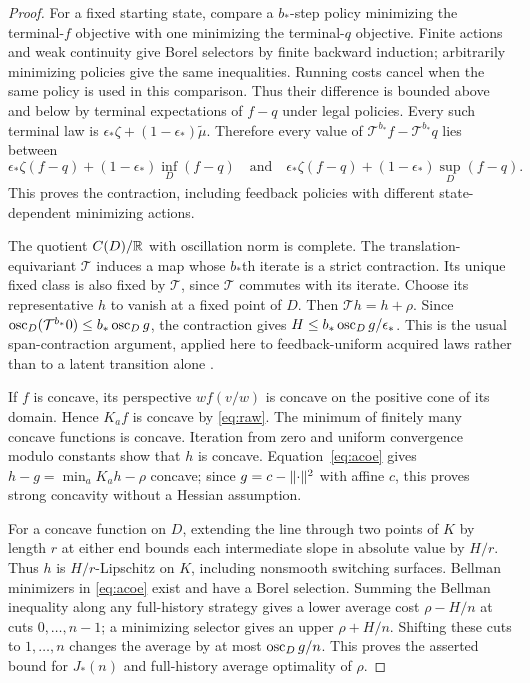 \begin{proof}
For a fixed starting state, compare a $b_*$-step policy minimizing the terminal-$f$ objective with one minimizing the terminal-$q$ objective. Finite actions and weak continuity give Borel selectors by finite backward induction; arbitrarily minimizing policies give the same inequalities. Running costs cancel when the same policy is used in this comparison. Thus their difference is bounded above and below by terminal expectations of $f-q$ under legal policies. Every such terminal law is
$\epsilon_*\zeta+(1-\epsilon_*)\widetilde\mu$. Therefore every value of $\mathcal T^{b_*}f-\mathcal T^{b_*}q$ lies between
\[
 \epsilon_*\zeta(f-q)+(1-\epsilon_*)\inf_D(f-q)
 \quad\text{and}\quad
 \epsilon_*\zeta(f-q)+(1-\epsilon_*)\sup_D(f-q).
\]
This proves the contraction, including feedback policies with different state-dependent minimizing actions.

The quotient $C(D)/\mathbb R$ with oscillation norm is complete. The translation-equivariant $\mathcal T$ induces a map whose $b_*$th iterate is a strict contraction. Its unique fixed class is also fixed by $\mathcal T$, since $\mathcal T$ commutes with its iterate. Choose its representative $h$ to vanish at a fixed point of $D$. Then $\mathcal T h=h+\rho$. Since $\operatorname{osc}_D(\mathcal T^{b_*}0)\le b_*\operatorname{osc}_Dg$, the contraction gives $H\le b_*\operatorname{osc}_Dg/\epsilon_*$. This is the usual span-contraction argument, applied here to feedback-uniform acquired laws rather than to a latent transition alone \cite{Dobrushin1956,Kurano1986}.

If $f$ is concave, its perspective $w f(v/w)$ is concave on the positive cone of its domain. Hence $K_af$ is concave by \eqref{eq:raw}. The minimum of finitely many concave functions is concave. Iteration from zero and uniform convergence modulo constants show that $h$ is concave. Equation~\eqref{eq:acoe} gives
$h-g=\min_aK_ah-\rho$ concave; since $g=c-\lVert\cdot\rVert^2$ with affine $c$, this proves strong concavity without a Hessian assumption.

For a concave function on $D$, extending the line through two points of $K$ by length $r$ at either end bounds each intermediate slope in absolute value by $H/r$. Thus $h$ is $H/r$-Lipschitz on $K$, including nonsmooth switching surfaces. Bellman minimizers in \eqref{eq:acoe} exist and have a Borel selection. Summing the Bellman inequality along any full-history strategy gives a lower average cost $\rho-H/n$ at cuts $0,\ldots,n-1$; a minimizing selector gives an upper $\rho+H/n$. Shifting these cuts to $1,\ldots,n$ changes the average by at most $\operatorname{osc}_Dg/n$. This proves the asserted bound for $J_*(n)$ and full-history average optimality of $\rho$.
\end{proof}

